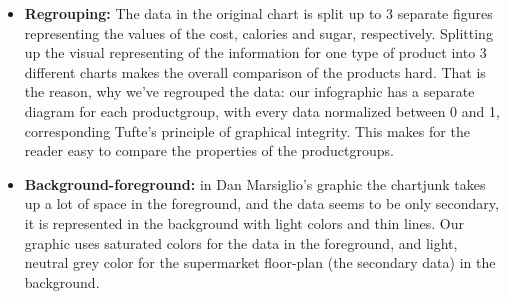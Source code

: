 \begin{itemize}
	\item \textbf{Regrouping:} The data in the original chart is split up to 3
		separate figures representing the values of the cost, calories and sugar,
		respectively. Splitting up the visual representing of the information for
		one type of product into 3 different charts makes the overall comparison of
		the products hard. That is the reason, why we've regrouped the data: our
		infographic has a separate  diagram for each productgroup, with every data
		normalized between 0 and 1, corresponding Tufte's principle of graphical
		integrity. This makes for the reader easy to compare the properties of the
		productgroups.

	\item \textbf{Background-foreground:} in Dan Marsiglio's graphic the chartjunk
		takes up a lot of space in the foreground, and the data seems to be only
		secondary, it is represented in the background with light colors and thin
		lines. Our graphic uses saturated colors for the data in the foreground, and
		light, neutral grey color for the supermarket floor-plan (the secondary
		data) in the background.
		
\end{itemize}

